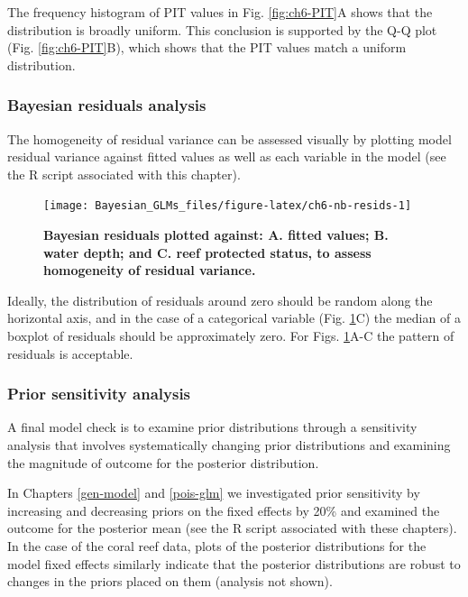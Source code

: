 \documentclass[
]{book}
\begin{document}
The frequency histogram of PIT values in Fig. \ref{fig:ch6-PIT}A shows that the distribution is broadly uniform. This conclusion is supported by the Q-Q plot (Fig. \ref{fig:ch6-PIT}B), which shows that the PIT values match a uniform distribution.

\hypertarget{nbglm-resids}{%
\subsubsection{Bayesian residuals analysis}\label{nbglm-resids}}

The homogeneity of residual variance can be assessed visually by plotting model residual variance against fitted values as well as each variable in the model (see the R script associated with this chapter).



\begin{figure}

{\centering \texttt{[image: Bayesian\_GLMs\_files/figure-latex/ch6-nb-resids-1]} 

}

\caption{\textbf{Bayesian residuals plotted against: A. fitted values; B. water depth; and C. reef protected status, to assess homogeneity of residual variance.}}\label{fig:ch6-nb-resids}
\end{figure}

Ideally, the distribution of residuals around zero should be random along the horizontal axis, and in the case of a categorical variable (Fig. \ref{fig:ch6-nb-resids}C) the median of a boxplot of residuals should be approximately zero. For Figs. \ref{fig:ch6-nb-resids}A-C the pattern of residuals is acceptable.

\hypertarget{nb-sens}{%
\subsubsection{Prior sensitivity analysis}\label{nb-sens}}

A final model check is to examine prior distributions through a sensitivity analysis that involves systematically changing prior distributions and examining the magnitude of outcome for the posterior distribution.

In Chapters \ref{gen-model} and \ref{pois-glm} we investigated prior sensitivity by increasing and decreasing priors on the fixed effects by 20\% and examined the outcome for the posterior mean (see the R script associated with these chapters). In the case of the coral reef data, plots of the posterior distributions for the model fixed effects similarly indicate that the posterior distributions are robust to changes in the priors placed on them (analysis not shown).
\end{document}

